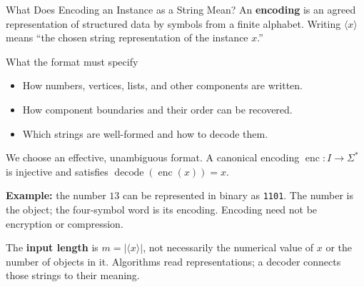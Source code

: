 \documentclass[10pt]{beamer}
\begin{document}
\begin{frame}{What Does Encoding an Instance as a String Mean?}
  \small
  An \textbf{encoding} is an agreed representation of structured data by
  symbols from a finite alphabet. Writing $\langle x\rangle$ means
  ``the chosen string representation of the instance $x$.''
  \begin{block}{What the format must specify}
    \begin{itemize}
      \item How numbers, vertices, lists, and other components are written.
      \item How component boundaries and their order can be recovered.
      \item Which strings are well-formed and how to decode them.
    \end{itemize}
    We choose an effective, unambiguous format. A canonical encoding
    $\operatorname{enc}:I\to\Sigma^*$ is injective and satisfies
    $\operatorname{decode}(\operatorname{enc}(x))=x$.
  \end{block}
  \pause
  \textbf{Example:} the number $13$ can be represented in binary as
  \texttt{1101}. The number is the object; the four-symbol word is its encoding.
  Encoding need not be encryption or compression.
  \pause
  \par\smallskip
  The \textbf{input length} is $m=|\langle x\rangle|$, not necessarily the
  numerical value of $x$ or the number of objects in it. Algorithms read
  representations; a decoder connects those strings to their meaning.
\end{frame}
\end{document}
